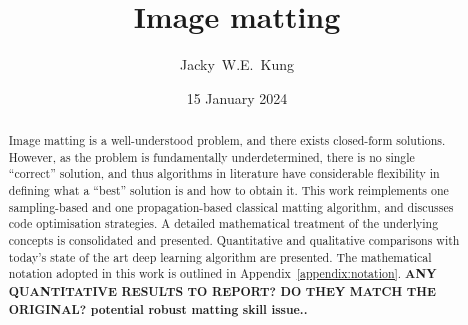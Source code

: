\documentclass{article}
\title{Image matting}
\author{Jacky~W.E.~Kung}
\date{15 January 2024}
\theoremstyle{definition}
\begin{document}
\doparttoc %
\faketableofcontents %


\maketitle
\begin{abstract}
    Image matting is a well-understood problem, and there exists closed-form solutions. However, as the problem is fundamentally underdetermined, there is no single ``correct'' solution, and thus algorithms in literature have considerable flexibility in defining what a ``best'' solution is and how to obtain it. This work reimplements one sampling-based and one propagation-based classical matting algorithm, and discusses code optimisation strategies. A detailed mathematical treatment of the underlying concepts is consolidated and presented. Quantitative and qualitative comparisons with today's state of the art deep learning algorithm are presented. The mathematical notation adopted in this work is outlined in Appendix~\ref{appendix:notation}.
    \textbf{ ANY QUANTITATIVE RESULTS TO REPORT? DO THEY MATCH THE ORIGINAL?  potential robust matting skill issue.. }
\end{abstract}
\end{document}
